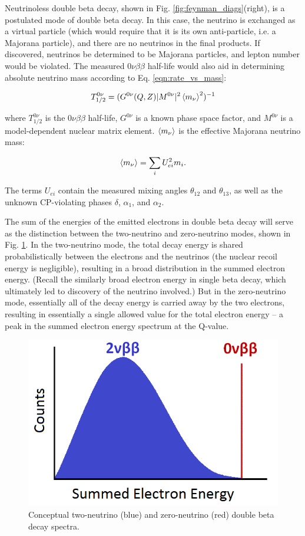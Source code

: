 Neutrinoless double beta decay, shown in Fig. \ref{fig:feynman_diags}(right), is a postulated mode of double beta decay. In this case, the neutrino is exchanged as a virtual particle (which would require that it is its own anti-particle, i.e. a Majorana particle), and there are no neutrinos in the final products. If discovered, neutrinos be determined to be Majorana particles, and lepton number would be violated.  The measured $0\nu\beta\beta$ half-life would also aid in determining absolute neutrino mass according to Eq. \ref{eqn:rate_vs_mass}:

\begin{equation}
T_{1/2}^{0\nu} = (G^{0\nu}(Q,Z)|M^{0\nu}|^{2}\braket{m_{\nu}}^{2})^{-1}
\label{eqn:rate_vs_mass}
\end{equation}

\noindent
where $T_{1/2}^{0\nu}$ is the $0\nu\beta\beta$ half-life,  $G^{0\nu}$ is a known phase space factor, and $M^{0\nu}$ is a model-dependent nuclear matrix element.  $\braket{m_{\nu}}$ is the effective Majorana neutrino mass:

\begin{equation}
\braket{m_{\nu}} = \sum\limits_{i} U_{ei}^{2} m_{i}.
\label{eqn:effectivemass}
\end{equation}

\noindent
The terms $U_{ei}$ contain the measured mixing angles $\theta_{12}$ and $\theta_{13}$, as well as the unknown CP-violating phases $\delta$, $\alpha_1$, and $\alpha_2$.

The sum of the energies of the emitted electrons in double beta decay will serve as the distinction between the two-neutrino and zero-neutrino modes, shown in Fig. \ref{fig:spectrum_bb}. In the two-neutrino mode, the total decay energy is shared probabilistically between the electrons and the neutrinos (the nuclear recoil energy is negligible), resulting in a broad distribution in the summed electron energy. (Recall the similarly broad electron energy in single beta decay, which ultimately led to discovery of the neutrino involved.) But in the zero-neutrino mode, essentially all of the decay energy is carried away by the two electrons, resulting in essentially a single allowed value for the total electron energy -- a peak in the summed electron energy spectrum at the Q-value. 

\begin{figure} %
        \centering
                \includegraphics[width=.5\textwidth]{figures/spectrum_bb.png}
                \caption{Conceptual two-neutrino (blue) and zero-neutrino (red) double beta decay spectra.}
\label{fig:spectrum_bb}
\end{figure}

